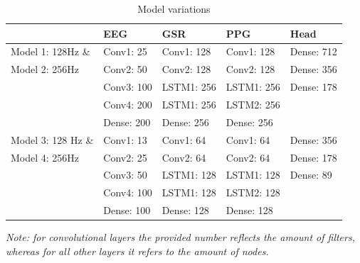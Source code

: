 \documentclass[12pt]{article}
\begin{document}
\bgroup
\def\arraystretch{1.6}%
\begin{table}[h]
\centering
\caption{Model variations	}
\label{table:modelvariations}
\begin{tabular}{lllll}
\hline
                   & EEG        & GSR        & PPG        & Head       \\ \hline
Model 1: 128Hz \&  & Conv1: 25  & Conv1: 128 & Conv1: 128 & Dense: 712 \\
Model 2: 256Hz     & Conv2: 50  & Conv2: 128 & Conv2: 128 & Dense: 356 \\
                   & Conv3: 100 & LSTM1: 256 & LSTM1: 256 & Dense: 178 \\
                   & Conv4: 200 & LSTM1: 256 & LSTM2: 256 &            \\
                   \vspace{3ex}
                   & Dense: 200 & Dense: 256 & Dense: 256 &            \\
Model 3: 128 Hz \& & Conv1: 13  & Conv1: 64  & Conv1: 64  & Dense: 356 \\
Model 4: 256Hz     & Conv2: 25  & Conv2: 64  & Conv2: 64  & Dense: 178 \\
                   & Conv3: 50  & LSTM1: 128 & LSTM1: 128 & Dense: 89  \\
                   & Conv4: 100 & LSTM1: 128 & LSTM2: 128 &            \\
                   & Dense: 100 & Dense: 128 & Dense: 128 &            \\ \hline
\end{tabular}
\vspace{2ex}

{\raggedright \textit{Note: for convolutional layers the provided number reflects the amount of filters, whereas for all other layers it refers to the amount of nodes.} \par}
\end{table}
\egroup
\end{document}
